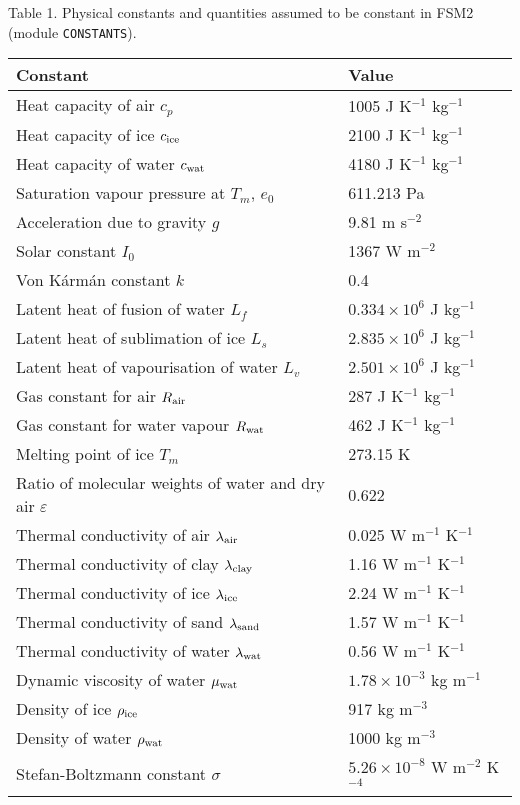 \documentclass[fleqn]{article}
\begin{document}
{\parindent0pt

Table 1. Physical constants and quantities assumed to be constant in FSM2 (module {\tt CONSTANTS}).
\begin{longtable}{|l|l|}
\hline
Constant                                           & Value \\
\hline
Heat capacity of air $c_p$                         & 1005 J K$^{-1}$ kg$^{-1}$ \\
Heat capacity of ice $c_{\rm ice}$                 & 2100 J K$^{-1}$ kg$^{-1}$ \\
Heat capacity of water $c_{\rm wat}$               & 4180 J K$^{-1}$ kg$^{-1}$ \\
Saturation vapour pressure at $T_m$, $e_0$         & 611.213 Pa                \\
Acceleration due to gravity $g$                    & 9.81 m s$^{-2}$           \\
Solar constant $I_0$                               & 1367 W m$^{-2}$           \\
Von K\'arm\'an constant $k$                        & 0.4                       \\
Latent heat of fusion of water $L_f$               & $0.334 \times 10^6$ J kg$^{-1}$ \\
Latent heat of sublimation of ice $L_s$            & $2.835 \times 10^6$ J kg$^{-1}$ \\
Latent heat of vapourisation of water $L_v$        & $2.501 \times 10^6$ J kg$^{-1}$ \\
Gas constant for air $R_{\rm air}$                 & 287 J K$^{-1}$ kg$^{-1}$  \\
Gas constant for water vapour $R_{\rm wat}$        & 462 J K$^{-1}$ kg$^{-1}$  \\
Melting point of ice $T_m$                         & 273.15 K                  \\
Ratio of molecular weights of water and dry air $\varepsilon$ & 0.622          \\
Thermal conductivity of air $\lambda_{\rm air}$    & 0.025 W m$^{-1}$ K$^{-1}$ \\
Thermal conductivity of clay $\lambda_{\rm clay}$  & 1.16 W m$^{-1}$ K$^{-1}$  \\
Thermal conductivity of ice $\lambda_{\rm ice}$    & 2.24 W m$^{-1}$ K$^{-1}$  \\
Thermal conductivity of sand $\lambda_{\rm sand}$  & 1.57 W m$^{-1}$ K$^{-1}$  \\
Thermal conductivity of water $\lambda_{\rm wat}$  & 0.56 W m$^{-1}$ K$^{-1}$  \\
Dynamic viscosity of water $\mu_{\rm wat}$         & $1.78 \times 10^{-3}$ kg m$^{-1}$ \\
Density of ice $\rho_{\rm ice}$                    & 917 kg m$^{-3}$           \\
Density of water $\rho_{\rm wat}$                  & 1000 kg m$^{-3}$          \\
Stefan-Boltzmann constant $\sigma$                 & $5.26 \times 10^{-8}$ W m$^{-2}$ K$^{-4}$ \\
\hline 
\end{longtable}

}
\end{document}
